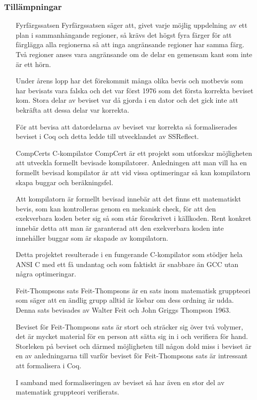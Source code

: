 \subsubsection{Tillämpningar}
\begin{itemize}

\item[Fyrfärgssatsen] Fyrfärgssatsen\autocite{gonthier2008formal} säger att,
givet varje möjlig uppdelning av ett plan i sammanhängande regioner, så krävs
det högst fyra färger för att färglägga alla regionerna så att inga angränsande
regioner har samma färg. Två regioner anses vara angränsande om de delar en
gemensam kant som inte är ett hörn.

Under årens lopp har det förekommit många olika bevis och motbevis som har
bevisats vara falska och  det var först 1976 som det första korrekta beviset
kom. Stora delar av beviset var då gjorda i en dator och det gick inte att
bekräfta att dessa delar var korrekta.

För att bevisa att datordelarna av beviset var korrekta så formaliserades
beviset i Coq och detta ledde till utvecklandet av SSReflect.

\item[CompCerts C-kompilator] CompCert\autocite{compcert} är ett projekt som
utforskar möjligheten att utveckla formellt bevisade kompilatorer. Anledningen
att man vill ha en formellt bevisad kompilator är att vid vissa optimeringar så
kan kompilatorn skapa buggar och beräkningsfel.

Att kompilatorn är formellt bevisad innebär att det finns ett matematiskt
bevis, som kan kontrolleras genom en mekanisk check, för att den exekverbara
koden beter sig så som står föreskrivet i källkoden. Rent konkret innebär detta
att man är garanterad att den exekverbara koden inte innehåller buggar som är
skapade av kompilatorn.

Detta projektet resulterade i en fungerande C-kompilator som stödjer hela ANSI
C med ett få undantag och som faktiskt är snabbare än GCC utan några
optimeringar.

\item[Feit-Thompsons sats] Feit-Thompsons är en sats inom matematisk gruppteori
som säger att en ändlig grupp alltid är lösbar om dess ordning är
udda\cite{aschbacher2004status}. Denna sats bevisades av Walter Feit och John
Griggs Thompson 1963.

Beviset för Feit-Thompsons sats är stort och sträcker sig över två volymer, det
är mycket material för en person att sätta sig in i och verifiera för hand.
Storleken på beviset och därmed möjligheten till någon dold miss i beviset är
en av anledningarna till varför beviset för Feit-Thompsons sats är intressant
att formalisera i Coq.

I samband med formaliseringen av beviset så har även en stor del av matematisk
gruppteori verifierats.

\end{itemize}

